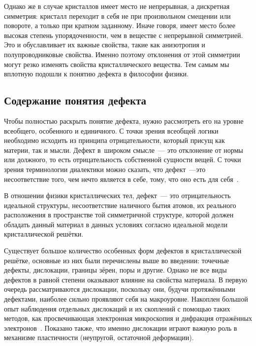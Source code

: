 \documentclass[a4paper, 14pt, titlepage]{extarticle}
\begin{document}
  Однако же в случае кристаллов имеет место не непрерывная, а дискретная симметрия: кристалл
  переходит в себя не при произвольном смещении или повороте, а только при кратном заданному.
  Иначе говоря, имеет место более высокая степень упорядоченности, чем в веществе с непрерывной
  симметрией. Это и обуславливает их важные свойства, такие как анизотропия и полупроводниковые
  свойства. Именно поэтому отклонения от этой симметрии могут резко изменять свойства
  кристаллического вещества. Тем самым мы вплотную подошли к понятию дефекта в философии физики.


  \subsection{Содержание понятия дефекта}

  Чтобы полностью раскрыть понятие дефекта, нужно рассмотреть его на уровне всеобщего, особенного и
  единичного. С точки зрения всеобщей логики необходимо исходить из принципа отрицательности,
  который присущ как материи, так и мысли. Дефект в~широком смысле~--- это отклонение от нормы или
  должного, то есть отрицательность собственной сущности вещей. С точки зрения терминологии
  диалектики можно сказать, что дефект~---это несоответствие того, чем нечто является в себе, тому,
  что оно есть для себя~\cite{hegel-logic}.


  В отношении физики кристаллических тел, дефект~--- это отрицательность идеальной структуры,
  несоответствие наличного бытия атомов, их реального расположения в пространстве той симметричной
  структуре, которой должен обладать данный материал в данных условиях согласно идеальной модели кристаллической решётки.

  Существует большое количество особенных форм дефектов в кристаллической решётке, основные из
  них были перечислены выше во введении: точечные дефекты, дислокации, границы зёрен, поры и другие.
  Однако не все виды дефектов в равной степени оказывают влияние на свойства материала. В первую очередь
  рассматриваются дислокации, поскольку они, будучи протяжёнными дефектами, наиболее сильно проявляют себя на макроуровне. Накоплен большой
  опыт наблюдения отдельных дислокаций и их скоплений с помощью таких методов, как просвечивающая
  электронная микроскопия и дифракция отражённых электронов~\cite{hasebe-ftmp}. Показано также, что
  именно дислокации играют важную роль в механизме пластичности (неупругой, остаточной деформации).
\end{document}
